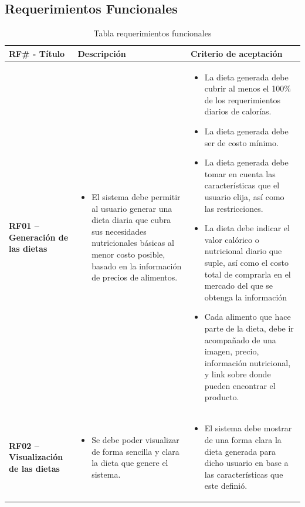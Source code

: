 \subsection{Requerimientos Funcionales}

\begin{longtable}[c]{| p{}  | p{}  | p{}  |}
    \caption{Tabla requerimientos funcionales}
    \label{tab:Tabla requerimientos  funcionales}
         \\ \hline \textbf{RF\# - T\'itulo} & \textbf{Descripci\'on} & \textbf{Criterio de aceptaci\'on}  \\ \hline
         \textbf{RF01 -- Generaci\'on de las dietas} & \begin{itemize}
             \item El sistema debe permitir al usuario generar una dieta diaria que cubra sus necesidades nutricionales b\'asicas al menor costo posible, basado en la informaci\'on de precios de alimentos.
         \end{itemize} & \begin{itemize}
             \item La dieta generada debe cubrir al menos el 100\% de los requerimientos diarios de calorías.
             \item La dieta generada debe ser de costo m\'inimo.
             \item La dieta generada debe tomar en cuenta las caracter\'isticas que el usuario elija, as\'i como las restricciones.
             \item La dieta debe indicar el valor cal\'orico o nutricional diario que suple, as\'i como el costo total de comprarla en el mercado del que se obtenga la informaci\'on
             \item Cada alimento que hace parte de la dieta, debe ir acompa\~{n}ado de una imagen, precio, informaci\'on nutricional, y link sobre donde pueden encontrar el producto.
         \end{itemize} \\\hline
         
         \textbf{RF02 -- Visualizaci\'on de las dietas} & \begin{itemize}
             \item Se debe poder visualizar de forma sencilla y clara la dieta que genere el sistema.
         \end{itemize}& \begin{itemize}
             \item El sistema debe mostrar de una forma clara la dieta generada para dicho usuario en base a las caracter\'isticas que este defini\'o.
         \end{itemize} \\  \hline



\end{longtable}
